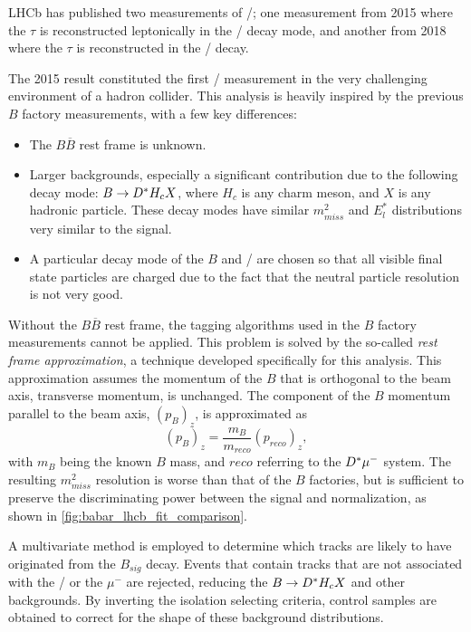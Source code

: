 LHCb has published two measurements of \RDst/; one measurement from 2015 where
the $\tau$ is reconstructed leptonically in the \TauLepMode/ decay mode, and
another from 2018 where the $\tau$ is reconstructed in the \TauHadMode/ decay.

The 2015 result constituted the first \RDst/ measurement in the very challenging
environment of a hadron collider.
This analysis is heavily inspired by the previous $B$ factory measurements, with
a few key differences:

\begin{itemize}
    \item The $B \overline{B}$ rest frame is unknown.
    \item Larger backgrounds, especially a significant contribution due to the
        following decay mode: $B \rightarrow \Dst/ H_c X$, where $H_c$ is any
        charm meson, and $X$ is any hadronic particle.
        These decay modes have similar $m^2_{miss}$ and $E^{*}_l$ distributions
        very similar to the signal.
    \item A particular decay mode of the $B$ and \Dst/ are chosen so that all
        visible final state particles are charged due to the fact that the
        neutral particle resolution is not very good.
\end{itemize}

Without the $B \overline{B}$ rest frame, the tagging algorithms used in the $B$
factory measurements cannot be applied.
This problem is solved by the so-called \emph{rest frame approximation}, a
technique developed specifically for this analysis.
This approximation assumes the momentum of the $B$ that is orthogonal to the
beam axis, transverse momentum, is unchanged.
The component of the $B$ momentum parallel to the beam axis, $(p_{B})_z$, is
approximated as
\begin{equation}
    (p_{B})_z = \frac{m_B}{m_{reco}} (p_{reco})_z,
\end{equation}
with $m_B$ being the known $B$ mass, and $reco$ referring to the $\Dst/ \mu^-$
system.
The resulting $m^2_{miss}$ resolution is worse than that of the $B$ factories,
but is sufficient to preserve the discriminating power between the signal and
normalization, as shown in \autoref{fig:babar_lhcb_fit_comparison}.

A multivariate method is employed to determine which tracks are likely to have
originated from the $B_{sig}$ decay.
Events that contain tracks that are not associated with the \Dst/ or the
$\mu^-$ are rejected, reducing the $B \rightarrow \Dst/ H_c X$ and other
backgrounds.
By inverting the isolation selecting criteria, control samples are obtained to
correct for the shape of these background distributions.

